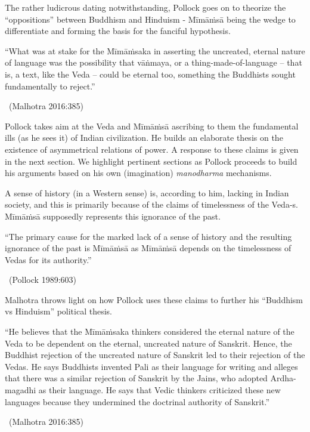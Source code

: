 The rather ludicrous dating notwithstanding, Pollock goes on to theorize the “oppositions” between Buddhism and Hinduism - Mīmāṁsā being the wedge to differentiate and forming the basis for the fanciful hypothesis.
\begin{myquote}
“What was at stake for the Mīmāṁsaka in asserting the uncreated, eternal nature of language was the possibility that vāṅmaya, or a thing-made-of-language – that is, a text, like the Veda – could be eternal too, something the Buddhists sought fundamentally to reject.”

~\hfill (Malhotra 2016:385)
\end{myquote}

Pollock takes aim at the Veda and Mīmāṁsā ascribing to them the fundamental ills (as he sees it) of Indian civilization. He builds an elaborate thesis on the existence of asymmetrical relations of power. A response to these claims is given in the next section. We highlight pertinent sections as Pollock proceeds to build his arguments based on his own (imagination) \textit{manodharma} mechanisms.

A sense of history (in a Western sense) is, according to him, lacking in Indian society, and this is primarily because of the claims of timelessness of the Veda-s. Mīmāṁsā supposedly represents this ignorance of the past.
\begin{myquote}
“The primary cause for the marked lack of a sense of history and the resulting ignorance of the past is Mīmāṁsā as Mīmāṁsā depends on the timelessness of Vedas for its authority.”

~\hfill (Pollock 1989:603)
\end{myquote}

\vskip 2pt

Malhotra throws light on how Pollock uses these claims to further his “Buddhism vs Hinduism” political thesis.
\begin{myquote}
“He believes that the Mīmāṁsaka thinkers considered the eternal nature of the Veda to be dependent on the eternal, uncreated nature of Sanskrit. Hence, the Buddhist rejection of the uncreated nature of Sanskrit led to their rejection of the Vedas. He says Buddhists invented Pali as their language for writing and alleges that there was a similar rejection of Sanskrit by the Jains, who adopted Ardha-magadhi as their language. He says that Vedic thinkers criticized these new languages because they undermined the doctrinal authority of Sanskrit.”

~\hfill (Malhotra 2016:385)
\end{myquote}

